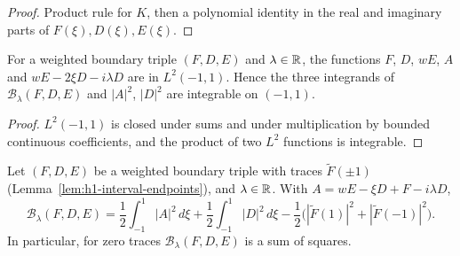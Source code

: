 \begin{proof}
\leanok
Product rule for $K$, then a polynomial identity in the real and imaginary
parts of $F(\xi),D(\xi),E(\xi)$.
\end{proof}

\begin{lemma}
\label{lem:weighted-boundary-integrable}
\leanok
For a weighted boundary triple $(F,D,E)$ and $\lambda\in\mathbb{R}$, the functions
$F$, $D$, $wE$, $A$ and $wE-2\xi D-i\lambda D$ are in $L^2(-1,1)$. Hence
the three integrands of $\mathcal B_\lambda(F,D,E)$ and $|A|^2$, $|D|^2$
are integrable on $(-1,1)$.
\end{lemma}

\begin{proof}
\leanok
$L^2(-1,1)$ is closed under sums and under multiplication by bounded
continuous coefficients, and the product of two $L^2$ functions is
integrable.
\end{proof}

\begin{lemma}
\label{lem:weighted-completion}
\leanok
Let $(F,D,E)$ be a weighted boundary triple with traces $\widetilde F(\pm1)$
(Lemma~\ref{lem:h1-interval-endpoints}), and $\lambda\in\mathbb{R}$. With
$A=wE-\xi D+F-i\lambda D$,
\[
  \mathcal B_\lambda(F,D,E)
  =\frac12\int_{-1}^1|A|^2\,d\xi
   +\frac12\int_{-1}^1|D|^2\,d\xi
   -\frac12\bigl(|\widetilde F(1)|^2+|\widetilde F(-1)|^2\bigr).
\]
In particular, for zero traces $\mathcal B_\lambda(F,D,E)$ is a sum of squares.
\end{lemma}

